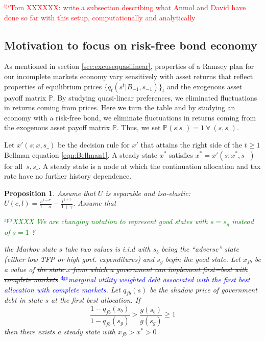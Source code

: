 \documentclass[12pt]{article}
\newcommand{\dge}[1]{\textcolor{blue}{$^{\textrm{dge}}${#1}}}
\newcommand{\apb}[1]{\textcolor{green}{$^{\textrm{apb}}${#1}}}
\newcommand{\tjs}[1]{\textcolor{red}{$^{\textrm{tjs}}${#1}}}
\newtheorem{proposition}[theorem]{Proposition}
\begin{document}
\tjs{Tom XXXXXX: write a subsection describing what Anmol and David have done so far with this setup, computationally
and analytically}

\subsection{Motivation to focus on risk-free bond economy\label{sec:riskfreeonly}}

As mentioned in section \ref{sec:excusequasilinear},  properties of a Ramsey plan for our incomplete markets economy vary sensitively  with   asset returns that reflect
	properties of equilibrium prices $\{q_t(s^t|B_{-1},s_{-1})\}_t$ and the exogenous asset payoff matrix $\mathbb{P}$.  By studying
quasi-linear preferences, we eliminated fluctuations in returns coming from prices.  Here we turn the table and by studying an economy
with a risk-free bond, we eliminate fluctuations in returns coming from the exogenous asset payoff matrix $\mathbb{P}$.
Thus, we set $\mathbb{P}(s|s\_)=1 \ \forall \ (s,s\_)$.  



Let $x'\left( s;{x},s\_\right) $ be the decision rule for $x'$ that attains the right side of the $t\geq1$ Bellman equation
\eqref{eqn:Bellman1}.  A steady state  ${x}^{*} $  satisfies ${ x}^{*}  =x' \left( s;{x}^{*},s_{-}\right) $ for all $%
\,s,s\_$. 
A steady state is a node at which the  continuation allocation and tax rate have no further history dependence. 

\begin{proposition}\label{prop:existenceU}  
Assume that $U$ is  separable and iso-elastic:	 $U(c,l) = \frac{c^{1-\sigma}}{1-\sigma} -\frac{ l^{1+\gamma}}{1+\gamma}$.
Assume that 

\apb{XXXX We are changing notation to represent good states with $s=s_g$ instead of $s=1$ ?}

	 the Markov state $s$ take two values is  i.i.d with $s_b$  being the ``adverse'' state (either low TFP or high govt. expenditures)
and $s_g$ begin the good state.
		Let $x_{fb}$ be a value of \st{the state $x$ from which a government can implement first=best with complete markets} \dge{marginal utility weighted debt associated with the first best allocation with complete markets}.
	 Let $q_{fb}(s)$ be the shadow price of government debt in state $s$ at the first best allocation.
	If
	\begin{equation}\label{eqn:prop52sufficient}
		\frac{1-q_{fb}(s_b)}{1-q_{fb}(s_g)} > \frac{g(s_b)}{g(s_g)}\geq 1
	\end{equation}
		then there exists a steady state with $x_{fb}>x^*>0$
		\end{proposition}
\end{document}
